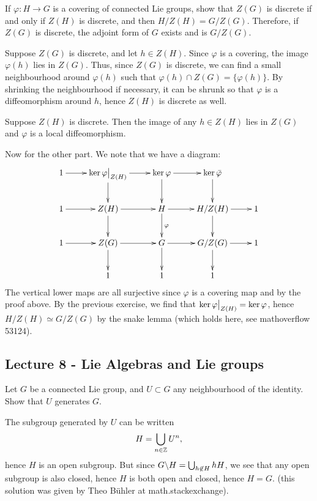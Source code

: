 \documentclass[11pt, english]{article}
\begin{document}
\begin{exc}[Exercise 7.12]
  If $\varphi:H \to G$ is a covering of connected Lie groups, show that $Z(G)$ is discrete if and only if $Z(H)$ is discrete, and then $H/Z(H)=G/Z(G)$. Therefore, if $Z(G)$ is discrete, the adjoint form of $G$ exists and is $G/Z(G)$.
\end{exc}
\begin{sol}
 Suppose $Z(G)$ is discrete, and let $h \in Z(H)$. Since $\varphi$ is a covering, the image $\varphi(h)$ lies in $Z(G)$. Thus, since $Z(G)$ is discrete, we can find a small neighbourhood around $\varphi(h)$ such that $\varphi(h) \cap Z(G) = \{ \varphi(h) \}$. By shrinking the neighbourhood if necessary, it can be shrunk so that $\varphi$ is a diffeomorphism around $h$, hence $Z(H)$ is discrete as well.

Suppose $Z(H)$ is discrete. Then the image of any $h \in Z(H)$ lies in $Z(G)$ and $\varphi$ is a local diffeomorphism. 

Now for the other part. We note that we have a diagram:
\[
\xymatrix{
1 \ar[r] & \ker \restr{\varphi}{Z(H)} \ar[r] \ar[d] & \ker \varphi \ar[r] \ar[d] & \ker \bar{\varphi} \ar[d] \\ 
1 \ar[r] & Z(H) \ar[r] \ar[d] & H \ar[r] \ar[d]^\varphi & H/Z(H) \ar[d] \ar[r] & 1 \\
1 \ar[r] & Z(G) \ar[d]  \ar[r] & G \ar[r] \ar[d]  & G/Z(G) \ar[d] \ar[r] & 1\\ 
& 1 & 1 & 1 
}
\]
The vertical lower maps are all surjective since $\varphi$ is a covering map and by the proof above. By the previous exercise, we find that $\ker \restr{\varphi}{Z(H)} = \ker \varphi$, hence $H/Z(H) \simeq G/Z(G)$ by the snake lemma (which holds here, see mathoverflow 53124).
\end{sol}

\subsection{Lecture 8 - Lie Algebras and Lie groups}

\begin{exc}[Exercise 8.1]
  Let $G$ be a connected Lie group, and $U \subset G$ any neighbourhood of the identity. Show that $U$ generates $G$.
\end{exc}

\begin{sol}
The subgroup generated by $U$ can be written 
\[
H = \bigcup_{n \in \mathbb{Z}} U^n,
\]
hence $H$ is an open subgroup. But since $G \backslash H = \bigcup_{h \not \in H} hH$, we see that any open subgroup is also closed, hence $H$ is both open and closed, hence $H=G$. (this solution was given by Theo Bühler at math.stackexchange).
\end{sol}
\end{document}
